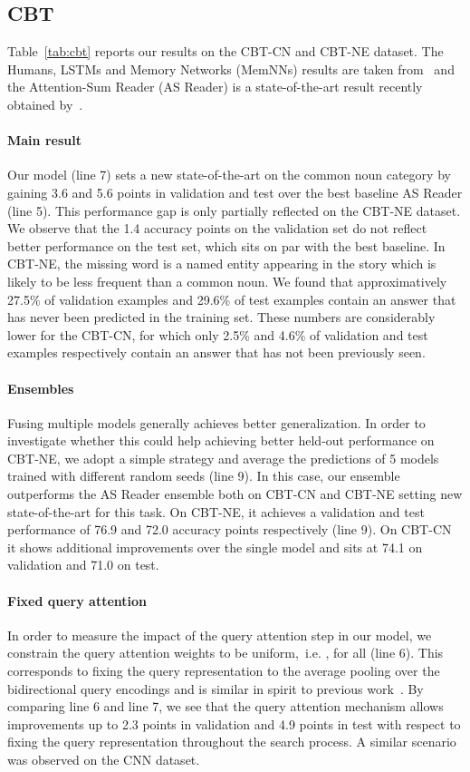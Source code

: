 \documentclass[11pt]{article}
\begin{document}
\subsection{CBT}
Table~\ref{tab:cbt} reports our results on the CBT-CN and CBT-NE dataset. The Humans, LSTMs and Memory Networks (MemNNs) results are taken from~\cite{hill2015goldilocks} and the Attention-Sum Reader (AS Reader) is a state-of-the-art result recently obtained by~\cite{watson}.

\paragraph{Main result} Our model (line 7) sets a new state-of-the-art on the common noun category by gaining 3.6 and 5.6 points in validation and test over the best baseline AS Reader (line 5). This performance gap is only partially reflected on the CBT-NE dataset. We observe that the 1.4 accuracy points on the validation set do not reflect better performance on the test set, which sits on par with the best baseline. In CBT-NE, the missing word is a named entity appearing in the story which is likely to be less frequent than a common noun. We found that approximatively 27.5\% of validation examples and 29.6\% of test examples contain an answer that has never been predicted in the training set. These numbers are considerably lower for the CBT-CN, for which only 2.5\% and 4.6\% of validation and test examples respectively contain an answer that has not been previously seen.

\paragraph{Ensembles} Fusing multiple models generally achieves better generalization.
In order to investigate whether this could help achieving better held-out performance on CBT-NE, we adopt a simple strategy and average the predictions of 5 models trained with different random seeds (line 9). In this case, our ensemble outperforms the AS Reader ensemble both on CBT-CN and CBT-NE setting new state-of-the-art for this task. On CBT-NE, it achieves a validation and test performance of 76.9 and 72.0 accuracy points respectively (line 9). On CBT-CN it shows additional improvements over the single model and sits at 74.1 on validation and 71.0 on test.

\paragraph{Fixed query attention} In order to measure the impact of the query attention step in our model, we constrain the query attention weights  to be uniform,~i.e. , for all  (line 6). This corresponds to fixing the query representation to the average pooling over the bidirectional query encodings and is similar in spirit to previous work~\cite{watson,danqi}. By comparing line 6 and line 7, we see that the query attention mechanism allows improvements up to 2.3 points in validation and 4.9 points in test with respect to fixing the query representation throughout the search process. A similar scenario was observed on the CNN dataset.
\end{document}
